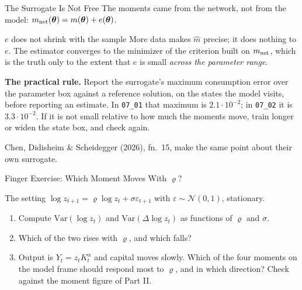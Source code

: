 \documentclass[aspectratio=169,11pt]{beamer}
\newcommand{\emphc}[1]{\textcolor{harvardcrimson}{#1}}
\newcommand{\exercisepause}{%
  \tikz[baseline=(XB.base)]{%
    \node[rectangle, rounded corners=2pt, fill=softgreen!25, draw=softgreen!70!black,
          inner xsep=4pt, inner ysep=1.5pt,
          font=\footnotesize\bfseries, text=darkgreen] (XB) {PAUSE: 5 min};}}
\newcommand{\str}{\bm{\theta}}          %
\begin{document}
\begin{frame}{The Surrogate Is Not Free}
\small
The moments came from the network, not from the model: $m_{\rm net}(\str) = m(\str) + e(\str)$.

\begin{alertblock}{$e$ does not shrink with the sample}
More data makes $\hat m$ precise; it does nothing to $e$. The estimator converges to the minimizer of the criterion built on $m_{\rm net}$, which is the truth only to the extent that $e$ is small \emph{across the parameter range}.
\end{alertblock}

\vspace{0.2cm}
\textbf{The practical rule.} Report the surrogate's \emphc{maximum} consumption error over the parameter box against a reference solution, on the states the model visits, before reporting an estimate. In \texttt{07\_01} that maximum is $2.1\cdot10^{-2}$; in \texttt{07\_02} it is $3.3\cdot10^{-2}$. If it is not small relative to how much the moments move, train longer or widen the state box, and check again.

\vspace{0.2cm}
{\footnotesize Chen, Didisheim \& Scheidegger (2026), fn.\ 15, make the same point about their own surrogate.}
\end{frame}

\begin{frame}{Finger Exercise: Which Moment Moves With $\varrho$?}
\begin{flushright}\exercisepause{}\end{flushright}
\vspace{-0.35cm}
\begin{exampleblock}{The setting}
$\log z_{t+1} = \varrho \log z_t + \sigma \varepsilon_{t+1}$ with $\varepsilon \sim \mathcal N(0,1)$, stationary.
\end{exampleblock}

\vspace{0.3cm}
\begin{enumerate}\itemsep6pt
  \item Compute $\mathrm{Var}(\log z_t)$ and $\mathrm{Var}(\Delta \log z_t)$ as functions of $\varrho$ and $\sigma$.
  \item Which of the two rises with $\varrho$, and which falls?
  \item Output is $Y_t = z_t K_t^\alpha$ and capital moves slowly. Which of the four moments on the model frame should respond most to $\varrho$, and in which direction? Check against the moment figure of Part II.
\end{enumerate}
\end{frame}
\end{document}
